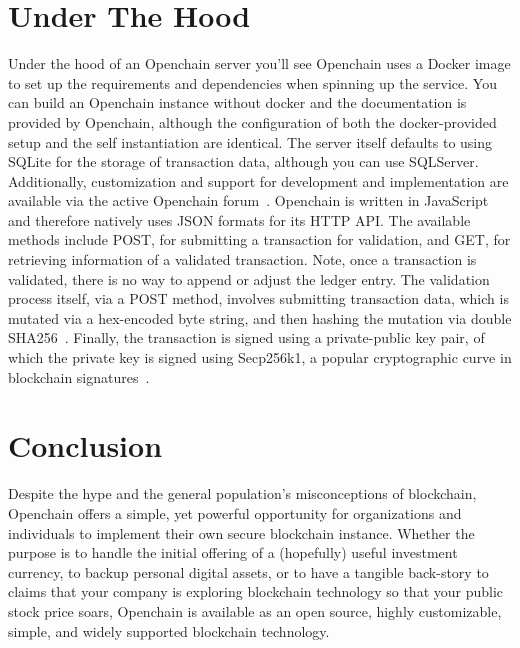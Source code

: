 \section{Under The Hood}
Under the hood of an Openchain server you'll see Openchain uses a Docker image to set up the requirements and dependencies when spinning up the service. You can build an Openchain instance without docker and the documentation is provided by Openchain, although the configuration of both the docker-provided setup and the self instantiation are identical. The server itself defaults to using SQLite for the storage of transaction data, although you can use SQLServer. Additionally, customization and support for development and implementation are available via the active Openchain forum~\cite{OpenchainForum}. Openchain is written in JavaScript and therefore natively uses JSON formats for its HTTP API. The available methods include POST, for submitting a transaction for validation, and GET, for retrieving information of a validated transaction. Note, once a transaction is validated, there is no way to append or adjust the ledger entry. The validation process itself, via a POST method, involves submitting transaction data, which is mutated via a hex-encoded byte string, and then hashing the mutation via double SHA256~\cite{SHA256Wiki}. Finally, the transaction is signed using a private-public key pair, of which the private key is signed using Secp256k1, a popular cryptographic curve in blockchain signatures~\cite{Secp256k1Wiki}.

\section{Conclusion}
Despite the hype and the general population's misconceptions of blockchain, Openchain offers a simple, yet powerful opportunity for organizations and individuals to implement their own secure blockchain instance. Whether the purpose is to handle the initial offering of a (hopefully) useful investment currency, to backup personal digital assets, or to have a tangible back-story to claims that your company is exploring blockchain technology so that your public stock price soars, Openchain is available as an open source, highly customizable, simple, and widely supported blockchain technology.



